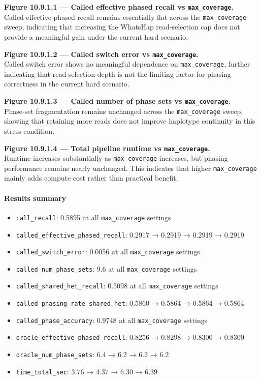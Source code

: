\documentclass[
]{article}
\providecommand{\tightlist}{%
  \setlength{\itemsep}{0pt}\setlength{\parskip}{0pt}}
\begin{document}
\textbf{Figure 10.9.1.1 --- Called effective phased recall vs
\texttt{max\_coverage}.}\\
Called effective phased recall remains essentially flat across the
\texttt{max\_coverage} sweep, indicating that increasing the WhatsHap
read-selection cap does not provide a meaningful gain under the current
hard scenario.

\textbf{Figure 10.9.1.2 --- Called switch error vs
\texttt{max\_coverage}.}\\
Called switch error shows no meaningful dependence on
\texttt{max\_coverage}, further indicating that read-selection depth is
not the limiting factor for phasing correctness in the current hard
scenario.

\textbf{Figure 10.9.1.3 --- Called number of phase sets vs
\texttt{max\_coverage}.}\\
Phase-set fragmentation remains unchanged across the
\texttt{max\_coverage} sweep, showing that retaining more reads does not
improve haplotype continuity in this stress condition.

\textbf{Figure 10.9.1.4 --- Total pipeline runtime vs
\texttt{max\_coverage}.}\\
Runtime increases substantially as \texttt{max\_coverage} increases, but
phasing performance remains nearly unchanged. This indicates that higher
\texttt{max\_coverage} mainly adds compute cost rather than practical
benefit.

\paragraph{Results summary}\label{results-summary}

\begin{itemize}
\tightlist
\item
  \texttt{call\_recall}: 0.5895 at all \texttt{max\_coverage} settings
\item
  \texttt{called\_effective\_phased\_recall}: 0.2917 → 0.2919 → 0.2919 →
  0.2919
\item
  \texttt{called\_switch\_error}: 0.0056 at all \texttt{max\_coverage}
  settings
\item
  \texttt{called\_num\_phase\_sets}: 9.6 at all \texttt{max\_coverage}
  settings
\item
  \texttt{called\_shared\_het\_recall}: 0.5098 at all
  \texttt{max\_coverage} settings
\item
  \texttt{called\_phasing\_rate\_shared\_het}: 0.5860 → 0.5864 → 0.5864
  → 0.5864
\item
  \texttt{called\_phase\_accuracy}: 0.9748 at all \texttt{max\_coverage}
  settings
\item
  \texttt{oracle\_effective\_phased\_recall}: 0.8256 → 0.8298 → 0.8300 →
  0.8300
\item
  \texttt{oracle\_num\_phase\_sets}: 6.4 → 6.2 → 6.2 → 6.2
\item
  \texttt{time\_total\_sec}: 3.76 → 4.37 → 6.30 → 6.39
\end{itemize}
\end{document}
